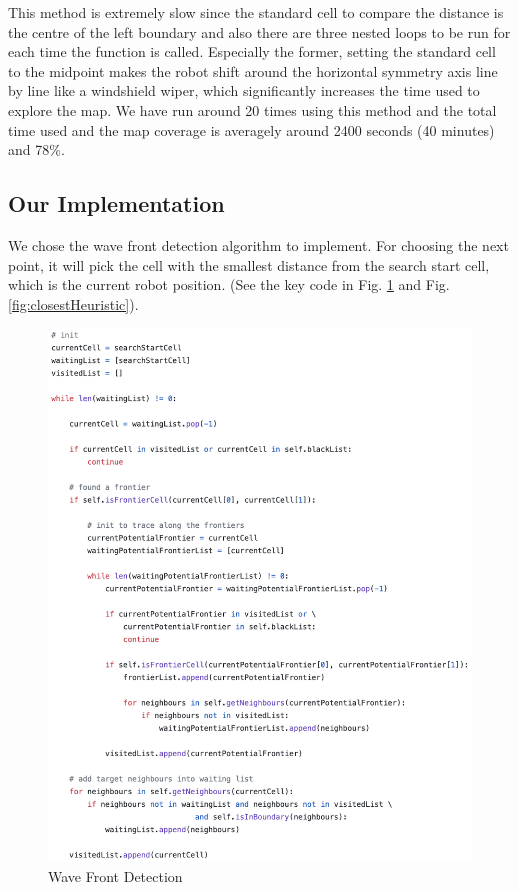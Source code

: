 \documentclass{article}
\begin{document}
This method is extremely slow since the standard cell to compare the distance is the centre of the left boundary and also there are three nested loops to be run for each time the function is called. Especially the former, setting the standard cell to the midpoint makes the robot shift around the horizontal symmetry axis line by line like a windshield wiper, which significantly increases the time used to explore the map. We have run around 20 times using this method and the total time used and the map coverage is averagely around 2400 seconds (40 minutes) and 78\%. 

\subsection {Our Implementation}
We chose the wave front detection algorithm to implement. For choosing the next point, it will pick the cell with the smallest distance from the search start cell, which is the current robot position. (See the key code in Fig. \ref{fig:waveFrontDetection} and Fig. \ref{fig:closestHeuristic}). 

\begin{figure}[ht]
\centering
\includegraphics[scale=0.5]{graphs/part2-3/WaveFrontDetection.png}
\caption{Wave Front Detection}
\label{fig:waveFrontDetection}
\end{figure}
\end{document}
